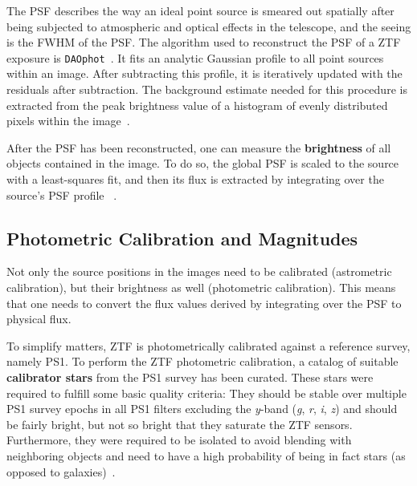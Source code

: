 The PSF describes the way an ideal point source is smeared out spatially after being subjected to atmospheric and optical effects in the telescope, and the seeing is the FWHM of the PSF. The algorithm used to reconstruct the PSF of a ZTF exposure is \texttt{DAOphot}~. It fits an analytic Gaussian profile to all point sources within an image. After subtracting this profile, it is iteratively updated with the residuals after subtraction. The background estimate needed for this procedure is extracted from the peak brightness value of a histogram of evenly distributed pixels within the image~\cite{Stetson1987}.

After the PSF has been reconstructed, one can measure the \textbf{brightness} of all objects contained in the image. To do so, the global PSF is scaled to the source with a least-squares fit, and then its flux is extracted by integrating over the source's PSF profile ~\cite{Stetson1987}.

\subsection{Photometric Calibration and Magnitudes}\label{magnitudes}

Not only the source positions in the images need to be calibrated (astrometric calibration), but their brightness as well (photometric calibration). This means that one needs to convert the flux values derived by integrating over the PSF to physical flux.

To simplify matters, ZTF is photometrically calibrated against a reference survey, namely PS1. To perform the ZTF photometric calibration, a catalog of suitable \textbf{calibrator stars} from the PS1 survey has been curated. These stars were required to fulfill some basic quality criteria: They should be stable over multiple PS1 survey epochs in all PS1 filters excluding the \textit{y}-band (\textit{g}, \textit{r}, \textit{i}, \textit{z}) and should be fairly bright, but not so bright that they saturate the ZTF sensors. Furthermore, they were required to be isolated to avoid blending with neighboring objects and need to have a high probability of being in fact stars (as opposed to galaxies)~\cite{Masci2019a}.

